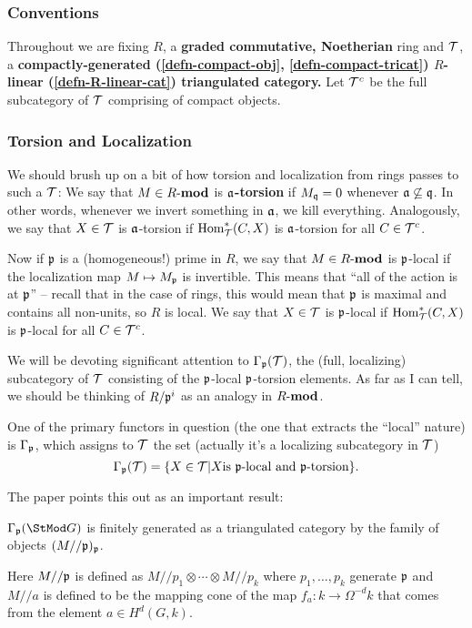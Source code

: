 \documentclass[12pt]{article}
\newcommand{\p}{\frakp}
\begin{document}
\subsubsection{Conventions}

Throughout we are fixing $R$, a \textbf{graded commutative, Noetherian} ring and $\mathcal{T}$, a \textbf{compactly-generated (\ref{defn-compact-obj}, \ref{defn-compact-tricat}) 
$R$-linear (\ref{defn-R-linear-cat}) triangulated category.} Let $\mathcal{T}^c$ be the full subcategory of $\mathcal{T}$ comprising of compact objects.

\subsubsection{Torsion and Localization}
We should brush up on a bit of how torsion and localization from rings passes to such a $\mathcal{T}$: We say that $M\in R\text{-}\mathbf{mod}$ is \textbf{$\mathfrak{a}$-torsion} if 
$M_{\mathfrak{q}}=0$ whenever $\mathfrak{a}\not\subseteq\mathfrak{q}$. In other words, whenever we invert something in $\mathfrak{a}$, we kill everything. Analogously,
we say that $X\in\mathcal{T}$ is $\mathfrak{a}$-torsion if $\operatorname{Hom}^\ast_{\mathcal{T}}(C,X)$ is $\mathfrak{a}$-torsion for all $C\in\mathcal{T}^c$.

Now if $\p$ is a (homogeneous!) prime in $R$,  we say that $M\in R\text{-}\mathbf{mod}$ is $\p$-local if the localization map $M\mapsto M_{\mathfrak{p}}$ is invertible.
This means that ``all of the action is at $\p$'' -- recall that in the case of rings, this would mean that $\mathfrak{p}$ is maximal and contains all non-units,
so $R$ is local. We say that $X\in\mathcal{T}$ is $\p$-local if $\operatorname{Hom}^\ast_{\mathcal{T}}(C,X)$ is $\p$-local for all $C\in\mathcal{T}^c$.

We will be devoting significant attention to $\Gamma_\p(\calT)$, the (full, localizing) subcategory of $\mathcal{T}$ consisting 
of the $\p$-local $\p$-torsion elements. As far as I can tell, we should be thinking of $R/\p^i$ as an analogy in $R\text{-}\mathbf{mod}$.

One of the primary functors in question (the one that extracts the ``local'' nature) is $\Gamma_\p$, which assigns to $\mathcal{T}$ the 
set (actually it's a localizing subcategory in $\mathcal{T}$)
\[\Gamma_\p(\calT)=\{X\in\calT| X\text{is $\p$-local and $\p$-torsion\}}.\]

The paper points this out as an important result:
\begin{lem}
	$\Gamma_\p(\StMod G)$ is finitely generated as a triangulated category by the family of objects $(M//\p)_\p$.
\end{lem}
Here $M//\p$ is defined as $M//p_1\otimes\cdots\otimes M//p_k$ where $p_1,\dots,p_k$ generate $\p$ and $M//a$ is defined to 
be the mapping cone of the map $f_a:k\to \Omega^{-d}k$ that comes from the element $a\in H^d(G,k)$.


\medskip

\printbibliography
\end{document}
